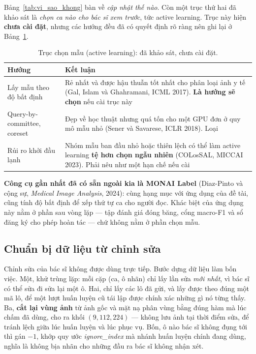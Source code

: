 \documentclass[11pt,a4paper]{article}
\begin{document}
Bảng~\ref{tab:vi_sao_khong} bàn về \emph{cập nhật thế nào}. Còn một trục thứ hai đã khảo sát là
\emph{chọn ca nào cho bác sĩ xem trước}, tức active learning. Trục này hiện \textbf{chưa cài đặt},
nhưng các hướng đều đã có quyết định rõ ràng nên ghi lại ở Bảng~\ref{tab:active}.

\begin{table}[htbp]
\centering
\caption{Trục chọn mẫu (active learning): đã khảo sát, chưa cài đặt.}
\label{tab:active}
\small
\begin{tabular}{@{}lp{9.2cm}@{}}
\toprule
\textbf{Hướng} & \textbf{Kết luận} \\
\midrule
Lấy mẫu theo độ bất định & Rẻ nhất và được hậu thuẫn tốt nhất cho phân loại ảnh y tế (Gal, Islam và Ghahramani, ICML 2017). \textbf{Là hướng sẽ chọn} nếu cài trục này \\
Query-by-committee, coreset & Đẹp về học thuật nhưng quá tốn cho một GPU đơn ở quy mô mẫu nhỏ (Sener và Savarese, ICLR 2018). Loại \\
Rủi ro khởi đầu lạnh & Nhóm mẫu ban đầu nhỏ hoặc thiên lệch có thể làm active learning \textbf{tệ hơn chọn ngẫu nhiên} (COLosSAL, MICCAI 2023). Phải nêu như một hạn chế nếu cài \\
\bottomrule
\end{tabular}
\end{table}

\textbf{Công cụ gần nhất đã có sẵn ngoài kia là MONAI Label} (Diaz-Pinto và cộng sự,
\textit{Medical Image Analysis}, 2024): cùng hạng mục với ứng dụng của đề tài, cũng tính độ bất
định để xếp thứ tự ca cho người đọc. Khác biệt của ứng dụng này nằm ở phần sau vòng lặp --- tập
đánh giá đóng băng, cổng macro-F1 và sổ đăng ký cho phép hoàn tác --- chứ không nằm ở phần chọn mẫu.

\subsection{Chuẩn bị dữ liệu từ chỉnh sửa}

Chỉnh sửa của bác sĩ không được dùng trực tiếp. Bước dựng dữ liệu làm bốn việc. Một, khử trùng lặp:
mỗi cặp (ca, ô nhãn) chỉ lấy lần sửa \textit{mới nhất}, vì bác sĩ có thể sửa đi sửa lại một ô. Hai,
chỉ lấy các lô đã gửi, và lấy được theo đúng một mã lô, để một lượt huấn luyện cũ tái lập được
chính xác những gì nó từng thấy. Ba, \textbf{cắt lại vùng ảnh} từ ảnh gốc và mặt nạ phân vùng bằng
đúng hàm mà lúc chấm đã dùng, cho ra khối $(9, 112, 224)$ --- không lưu ảnh tại thời điểm sửa, để
tránh lệch giữa lúc huấn luyện và lúc phục vụ. Bốn, ô nào bác sĩ không đụng tới thì gán $-1$, khớp
quy ước \textit{ignore\_index} mà nhánh huấn luyện chính đang dùng, nghĩa là không bịa nhãn cho
những đầu ra bác sĩ không nhận xét.
\end{document}
